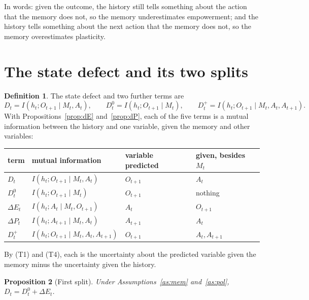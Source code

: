 \documentclass{article}
\newtheorem{proposition}{Proposition}[section]
\theoremstyle{definition}
\newtheorem{definition}[proposition]{Definition}
\theoremstyle{remark}
\newcommand{\dE}{\Delta E}
\newcommand{\dP}{\Delta P}
\begin{document}
In words: given the outcome, the history still tells something about the action that the memory does not, so the memory underestimates empowerment; and the history tells something about the next action that the memory does not, so the memory overestimates plasticity.

\section{The state defect and its two splits}\label{sec:splits}

\begin{definition}\label{def:terms}
The state defect and two further terms are
\[
D_t=I(h_t;O_{t+1}\mid M_t,A_t),\qquad D^0_t=I(h_t;O_{t+1}\mid M_t),\qquad D^+_t=I(h_t;O_{t+1}\mid M_t,A_t,A_{t+1}).
\]
With Propositions~\ref{prop:dE} and~\ref{prop:dP}, each of the five terms is a mutual information between the history and one variable, given the memory and other variables:
\begin{center}
\small
\begin{tabular}{llll}
\toprule
term & mutual information & variable predicted & given, besides $M_t$\\
\midrule
$D_t$ & $I(h_t;O_{t+1}\mid M_t,A_t)$ & $O_{t+1}$ & $A_t$\\
$D^0_t$ & $I(h_t;O_{t+1}\mid M_t)$ & $O_{t+1}$ & nothing\\
$\dE_t$ & $I(h_t;A_t\mid M_t,O_{t+1})$ & $A_t$ & $O_{t+1}$\\
$\dP_t$ & $I(h_t;A_{t+1}\mid M_t,A_t)$ & $A_{t+1}$ & $A_t$\\
$D^+_t$ & $I(h_t;O_{t+1}\mid M_t,A_t,A_{t+1})$ & $O_{t+1}$ & $A_t,A_{t+1}$\\
\bottomrule
\end{tabular}
\end{center}
By (T1) and (T4), each is the uncertainty about the predicted variable given the memory minus the uncertainty given the history.
\end{definition}

\begin{proposition}[First split]\label{prop:split1}
Under Assumptions~\ref{as:mem} and~\ref{as:pol}, $D_t=D^0_t+\dE_t$.
\end{proposition}
\end{document}

